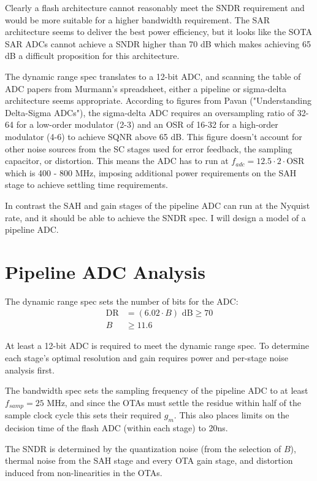 \documentclass[11pt]{article}
\begin{document}
Clearly a flash architecture cannot reasonably meet the SNDR requirement and would be more suitable for a higher bandwidth requirement.
The SAR architecture seems to deliver the best power efficiency, but it looks like the SOTA SAR ADCs cannot achieve a SNDR higher than 70 dB which makes achieving 65 dB a difficult proposition for this architecture.

The dynamic range spec translates to a 12-bit ADC, and scanning the table of ADC papers from Murmann's spreadsheet, either a pipeline or sigma-delta architecture seems appropriate.
According to figures from Pavan ("Understanding Delta-Sigma ADCs"), the sigma-delta ADC requires an oversampling ratio of 32-64 for a low-order modulator (2-3) and an OSR of 16-32 for a high-order modulator (4-6) to achieve SQNR above 65 dB.
This figure doesn't account for other noise sources from the SC stages used for error feedback, the sampling capacitor, or distortion.
This means the ADC has to run at $f_{adc} = 12.5 \cdot 2 \cdot \text{OSR}$ which is 400 - 800 MHz, imposing additional power requirements on the SAH stage to achieve settling time requirements.

In contrast the SAH and gain stages of the pipeline ADC can run at the Nyquist rate, and it should be able to achieve the SNDR spec.
I will design a model of a pipeline ADC.

\section{Pipeline ADC Analysis}
The dynamic range spec sets the number of bits for the ADC:
\begin{align*}
  \text{DR} &= (6.02 \cdot B) \text{ dB} \geq 70 \\
  B &\geq 11.6
\end{align*}

At least a 12-bit ADC is required to meet the dynamic range spec.
To determine each stage's optimal resolution and gain requires power and per-stage noise analysis first.

The bandwidth spec sets the sampling frequency of the pipeline ADC to at least $f_{samp} = 25$ MHz, and since the OTAs must settle the residue within half of the sample clock cycle this sets their required $g_m$.
This also places limits on the decision time of the flash ADC (within each stage) to 20ns.

The SNDR is determined by the quantization noise (from the selection of $B$), thermal noise from the SAH stage and every OTA gain stage, and distortion induced from non-linearities in the OTAs.
\end{document}
